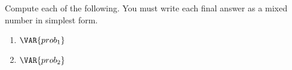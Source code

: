 
Compute each of the following. You must write each final answer as a mixed number in simplest form.


\begin{enumerate}
    \item $\VAR{prob_1}$

    \begin{ansenv}
        \vspace{20pt}
    \end{ansenv}
    \vfill

    \item $\VAR{prob_2}$

    \begin{ansenv}
        \vspace{20pt}
    \end{ansenv}
    \vfill

\end{enumerate}

\trueemptypage